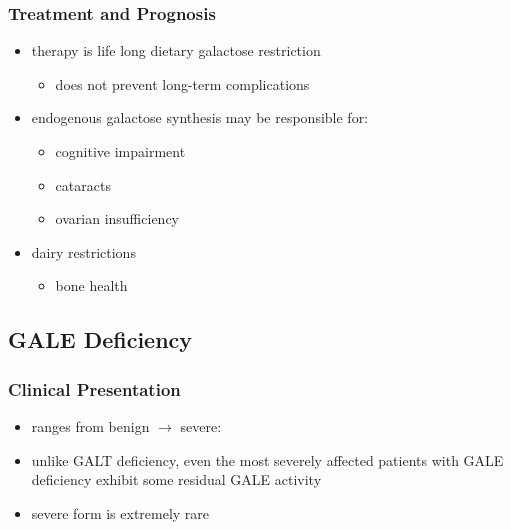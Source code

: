 \documentclass{scrartcl}
\begin{document}
\subsubsection{Treatment and Prognosis}
\label{sec:org8f12bc0}
\begin{itemize}
\item therapy is life long dietary galactose restriction
\begin{itemize}
\item does not prevent long-term complications
\end{itemize}
\item endogenous galactose synthesis may be responsible for:
\begin{itemize}
\item cognitive impairment
\item cataracts
\item ovarian insufficiency
\end{itemize}
\item dairy restrictions
\begin{itemize}
\item bone health
\end{itemize}
\end{itemize}

\subsection{GALE Deficiency}
\label{sec:org82477d2}
\subsubsection{Clinical Presentation}
\label{sec:org41f5553}
\begin{itemize}
\item ranges from benign \(\to\) severe:
\item unlike GALT deficiency, even the most severely affected patients
with GALE deficiency exhibit some residual GALE activity
\item severe form is extremely rare
\end{itemize}
\end{document}
